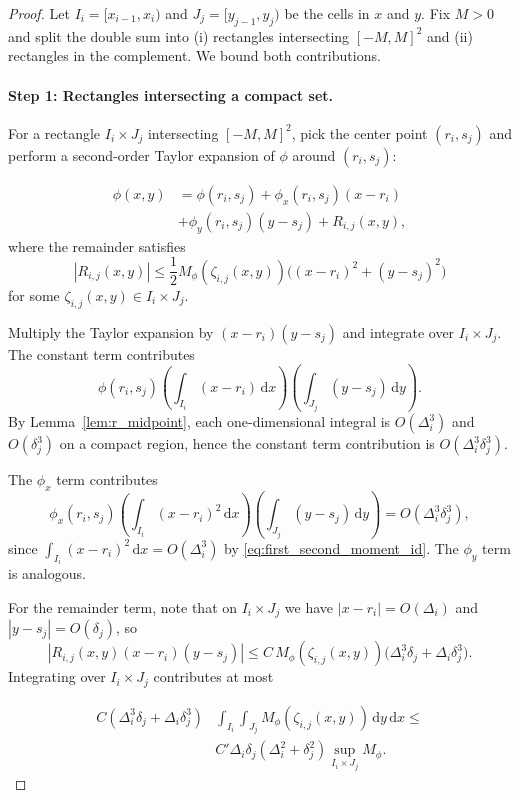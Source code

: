 \documentclass{article}
\newcommand{\abs}[1]{\left\lvert #1 \right\rvert}
\newcommand{\dd}{\,\mathrm{d}}
\begin{document}
\begin{proof}
Let $I_i=[x_{i-1},x_i)$ and $J_j=[y_{j-1},y_j)$ be the cells in $x$ and $y$. Fix $M>0$ and split the double sum into (i) rectangles intersecting $[-M,M]^2$ and (ii) rectangles in the complement. We bound both contributions.

\paragraph*{Step 1: Rectangles intersecting a compact set.}
For a rectangle $I_i\times J_j$ intersecting $[-M,M]^2$, pick the center point $(r_i,s_j)$ and perform a second-order Taylor expansion of $\phi$ around $(r_i,s_j)$:

\begin{align*}
    \phi(x,y) &=\phi(r_i,s_j)+\phi_x(r_i,s_j)(x-r_i)\\
    &+\phi_y(r_i,s_j)(y-s_j)+R_{i,j}(x,y),
\end{align*}
where the remainder satisfies
\[
\abs{R_{i,j}(x,y)}
\le \frac{1}{2} M_\phi(\zeta_{i,j}(x,y))\bigl((x-r_i)^2+(y-s_j)^2\bigr)
\]
for some $\zeta_{i,j}(x,y)\in I_i\times J_j$.

Multiply the Taylor expansion by $(x-r_i)(y-s_j)$ and integrate over $I_i\times J_j$. The constant term contributes
\[
\phi(r_i,s_j)\left(\int_{I_i}(x-r_i)\dd x\right)\left(\int_{J_j}(y-s_j)\dd y\right).
\]
By Lemma~\ref{lem:r_midpoint}, each one-dimensional integral is $O(\Delta_i^3)$ and $O(\delta_j^3)$ on a compact region, hence the constant term contribution is $O(\Delta_i^3\delta_j^3)$.

The $\phi_x$ term contributes
\[
\phi_x(r_i,s_j)\left(\int_{I_i}(x-r_i)^2\dd x\right)\left(\int_{J_j}(y-s_j)\dd y\right)
=O(\Delta_i^3\delta_j^3),
\]
since $\int_{I_i}(x-r_i)^2\dd x=O(\Delta_i^3)$ by \eqref{eq:first_second_moment_id}. The $\phi_y$ term is analogous.

For the remainder term, note that on $I_i\times J_j$ we have $\abs{x-r_i}=O(\Delta_i)$ and $\abs{y-s_j}=O(\delta_j)$, so
\[
\abs{R_{i,j}(x,y)(x-r_i)(y-s_j)}
\le C\, M_\phi(\zeta_{i,j}(x,y))\bigl(\Delta_i^3\delta_j+\Delta_i\delta_j^3\bigr).
\]
Integrating over $I_i\times J_j$ contributes at most

\begin{align*}
C\left(\Delta_i^3\delta_j+\Delta_i\delta_j^3\right)&\int_{I_i}\int_{J_j} M_\phi(\zeta_{i,j}(x,y))\dd y\dd x
\le\\
&C'\Delta_i\delta_j\left(\Delta_i^2+\delta_j^2\right)\sup_{I_i\times J_j}M_\phi.
\end{align*}


\end{proof}
\end{document}
